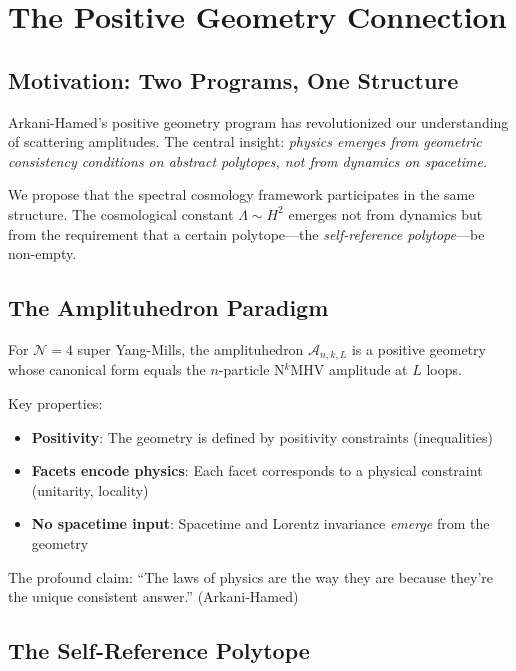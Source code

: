 
\section{The Positive Geometry Connection}

\subsection{Motivation: Two Programs, One Structure}

Arkani-Hamed's positive geometry program has revolutionized our understanding of scattering amplitudes. The central insight: \emph{physics emerges from geometric consistency conditions on abstract polytopes, not from dynamics on spacetime.}

We propose that the spectral cosmology framework participates in the same structure. The cosmological constant $\Lambda \sim H^2$ emerges not from dynamics but from the requirement that a certain polytope---the \emph{self-reference polytope}---be non-empty.

\subsection{The Amplituhedron Paradigm}

\begin{definition}
For $\mathcal{N}=4$ super Yang-Mills, the amplituhedron $\mathcal{A}_{n,k,L}$ is a positive geometry whose canonical form equals the $n$-particle N$^k$MHV amplitude at $L$ loops.
\end{definition}

Key properties:
\begin{itemize}
    \item \textbf{Positivity}: The geometry is defined by positivity constraints (inequalities)
    \item \textbf{Facets encode physics}: Each facet corresponds to a physical constraint (unitarity, locality)
    \item \textbf{No spacetime input}: Spacetime and Lorentz invariance \emph{emerge} from the geometry
\end{itemize}

The profound claim: ``The laws of physics are the way they are because they're the unique consistent answer.'' (Arkani-Hamed)

\subsection{The Self-Reference Polytope}

